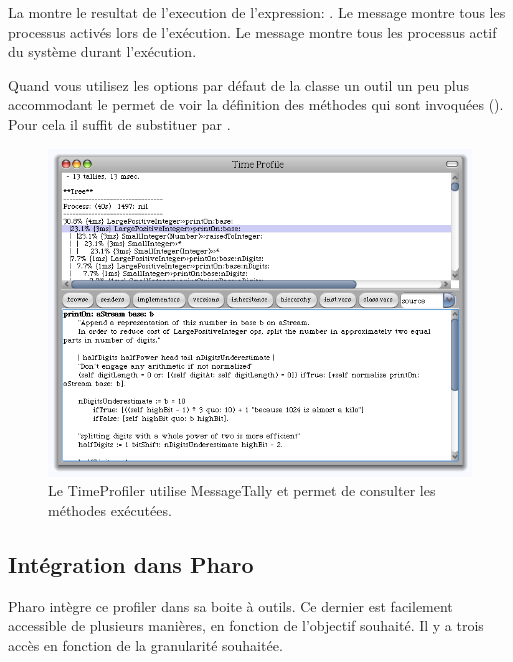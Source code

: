 \documentclass[a4paper,10pt,twoside]{book}
\begin{document}
La  montre le resultat de l'execution de l'expression: 
.
Le message  montre tous les processus activ\'es lors de l'ex\'ecution. Le message  montre tous les processus actif du syst\`eme durant l'ex\'ecution. 



Quand vous utilisez les options par d\'efaut de la classe  un outil un peu plus accommodant le  permet de voir la d\'efinition des m\'ethodes qui sont invoqu\'ees (). Pour cela il suffit de substituer  par .


\begin{figure}
	\begin{center}
	\includegraphics[width=.8\linewidth]{TimeProfiler}
	\caption{Le TimeProfiler utilise MessageTally et permet de consulter les m\'ethodes ex\'ecut\'ees.
	}
	\end{center}
\end{figure}


\subsection{Int\'egration dans Pharo}
Pharo int\`egre ce profiler dans sa boite \`a outils. Ce dernier est facilement accessible de plusieurs mani\`eres, en fonction de l'objectif souhait\'e. Il y a trois acc\`es en fonction de la granularit\'e souhait\'ee.
\end{document}
